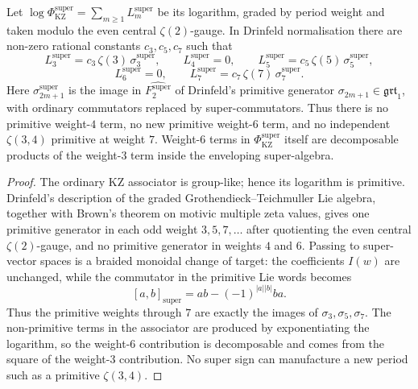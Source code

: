 \begin{proposition}
\label{prop:super-associator-weight-expansion}
Let
$\log \Phi_{\mathrm{KZ}}^{\mathrm{super}}
=\sum_{m\geq 1}L_m^{\mathrm{super}}$
be its logarithm, graded by period weight and taken modulo the even
central $\zeta(2)$-gauge.  In Drinfeld normalisation there are
non-zero rational constants $c_3,c_5,c_7$ such that
\[
 L_3^{\mathrm{super}}=c_3\,\zeta(3)\,\sigma_3^{\mathrm{super}},
 \qquad
 L_4^{\mathrm{super}}=0,
 \qquad
 L_5^{\mathrm{super}}=c_5\,\zeta(5)\,\sigma_5^{\mathrm{super}},
\]
\[
 L_6^{\mathrm{super}}=0,
 \qquad
 L_7^{\mathrm{super}}=c_7\,\zeta(7)\,\sigma_7^{\mathrm{super}}.
\]
Here $\sigma_{2m+1}^{\mathrm{super}}$ is the image in
$\widehat{F_2^{\mathrm{super}}}$ of Drinfeld's primitive generator
$\sigma_{2m+1}\in\mathfrak{grt}_1$, with ordinary commutators replaced
by super-commutators.  Thus there is no primitive weight-$4$ term, no
new primitive weight-$6$ term, and no independent
$\zeta(3,4)$ primitive at weight $7$.  Weight-$6$ terms in
$\Phi_{\mathrm{KZ}}^{\mathrm{super}}$ itself are decomposable products
of the weight-$3$ term inside the enveloping super-algebra.
\end{proposition}

\begin{proof}
The ordinary KZ associator is group-like; hence its logarithm is
primitive.  Drinfeld's description of the graded Grothendieck--Teichmuller
Lie algebra, together with Brown's theorem on motivic multiple zeta
values, gives one primitive generator in each odd weight
$3,5,7,\ldots$ after quotienting the even central $\zeta(2)$-gauge, and
no primitive generator in weights $4$ and $6$.  Passing to super-vector
spaces is a braided monoidal change of target: the coefficients
$I(w)$ are unchanged, while the commutator in the primitive Lie words
becomes
\[
 [a,b]_{\mathrm{super}}=ab-(-1)^{|a||b|}ba .
\]
Thus the primitive weights through $7$ are exactly the images of
$\sigma_3,\sigma_5,\sigma_7$.  The non-primitive terms in the
associator are produced by exponentiating the logarithm, so the
weight-$6$ contribution is decomposable and comes from the square of
the weight-$3$ contribution.  No super sign can manufacture a new
period such as a primitive $\zeta(3,4)$.
\end{proof}


